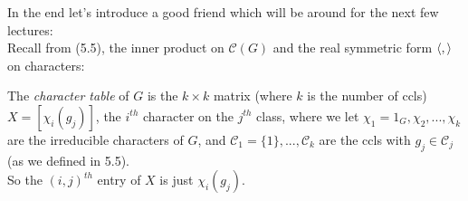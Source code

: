 \documentclass[a4paper]{article}
\begin{document}
In the end let's introduce a good friend which will be around for the next few lectures:\\
Recall from (5.5), the inner product on $\mathcal{C}(G)$ and the real symmetric form $\langle,\rangle$ on characters:
\begin{defi}
The \emph{character table} of $G$ is the $k \times k$ matrix (where $k$ is the number of ccls) $X = [\chi_i (g_j)]$, the $i^{th}$ character on the $j^{th}$ class, where we let $\chi_1 =1_G, \chi_2,...,\chi_k$ are the irreducible characters of $G$, and $\mathcal{C}_1 =\{1\},...,\mathcal{C}_k$ are the ccls with $g_j \in \mathcal{C}_j$ (as we defined in 5.5).\\
So the $(i,j)^{th}$ entry of $X$ is just $\chi_i (g_j)$.
\end{defi}

\end{document}
